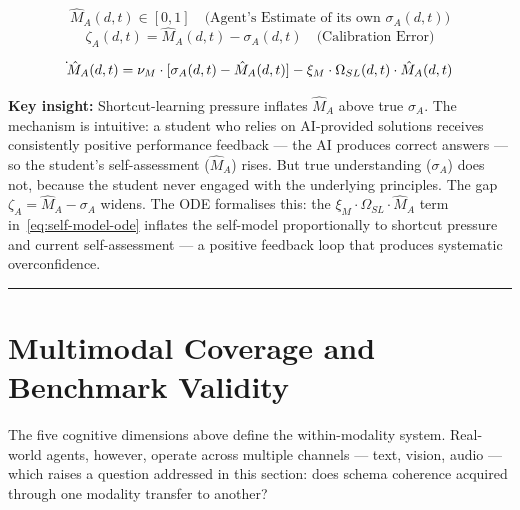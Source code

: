 \begin{equation}\label{eq:self-model}
\hat{M}_A(d,t) \in [0,1] \quad \text{(Agent's Estimate of its own } \sigma_A(d,t))
\end{equation}
\begin{equation}\label{eq:calibration-error}
\zeta_A(d,t) = \hat{M}_A(d,t) - \sigma_A(d,t) \quad \text{(Calibration Error)}
\end{equation}

\begin{equation}\label{eq:self-model-ode}
\dot{\vphantom{M}}\hat{M}_A(d,t) = \nu_M \cdot [\sigma_A(d,t) - \hat{M}_A(d,t)] - \xi_M \cdot \Omega_{SL}(d,t) \cdot \hat{M}_A(d,t)
\end{equation}

\textbf{Key insight:} Shortcut-learning pressure inflates $\hat{M}_A$ above true
$\sigma_A$. The mechanism is intuitive: a student who relies on AI-provided
solutions receives consistently positive performance feedback --- the AI
produces correct answers --- so the student's self-assessment ($\hat{M}_A$)
rises. But true understanding ($\sigma_A$) does not, because the student
never engaged with the underlying principles. The gap $\zeta_A = \hat{M}_A - \sigma_A$
widens. The ODE formalises this: the $\xi_M \cdot \Omega_{SL} \cdot \hat{M}_A$ term
in~\eqref{eq:self-model-ode} inflates the self-model proportionally to
shortcut pressure and current self-assessment --- a positive feedback loop
that produces systematic overconfidence.



\noindent\rule{\linewidth}{0.4pt}


\section{Multimodal Coverage and Benchmark Validity}\label{sec:multimodal}

The five cognitive dimensions above define the within-modality system.
Real-world agents, however, operate across multiple channels --- text,
vision, audio --- which raises a question addressed in this section:
does schema coherence acquired through one modality transfer to another?

